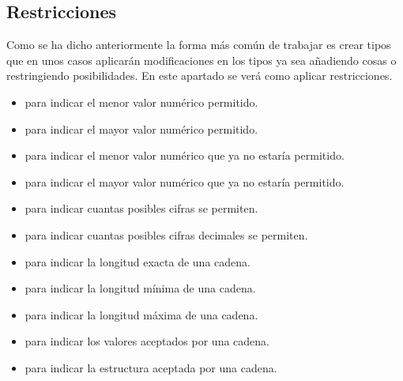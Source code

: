 \documentclass[letterpaper,10pt,spanish]{sphinxmanual}
\begin{document}
\subsection{Restricciones}
\label{\detokenize{tema5:restricciones}}
Como se ha dicho anteriormente la forma más común de trabajar es crear tipos que en unos casos aplicarán modificaciones en los tipos ya sea añadiendo cosas o restringiendo posibilidades. En este apartado se verá como aplicar restricciones.

\begin{itemize}
\item {} 
 para indicar el menor valor numérico permitido.

\item {} 
 para indicar el mayor valor numérico permitido.

\item {} 
 para indicar el menor valor numérico que ya no estaría permitido.

\item {} 
 para indicar el mayor valor numérico que ya no estaría permitido.

\item {} 
 para indicar cuantas posibles cifras se permiten.

\item {} 
 para indicar cuantas posibles cifras decimales se permiten.

\item {} 
 para indicar la longitud exacta de una cadena.

\item {} 
 para indicar la longitud mínima de una cadena.

\item {} 
 para indicar la longitud máxima de una cadena.

\item {} 
 para indicar los valores aceptados por una cadena.

\item {} 
 para indicar la estructura aceptada por una cadena.

\end{itemize}
\end{document}
